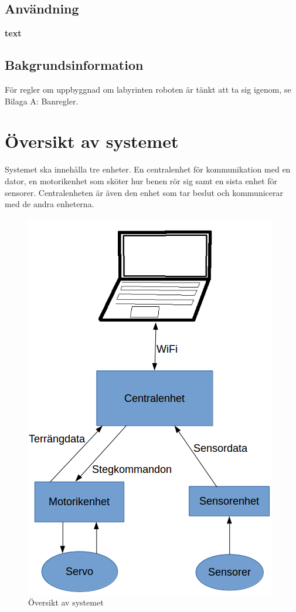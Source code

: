 \documentclass[a4paper,titlepage,12pt]{article}
\begin{document}
	\subsection{Användning}
	\textbf{text}
	\subsection{Bakgrundsinformation}
	För regler om uppbyggnad om labyrinten roboten är tänkt att ta sig igenom, se
	Bilaga A: Banregler.


	\section{Översikt av systemet}
	Systemet ska innehålla tre enheter. En centralenhet för kommunikation med en dator, en motorikenhet
	som sköter hur benen rör sig samt en sista enhet för sensorer. Centralenheten är även den enhet som
	tar beslut och kommunicerar med de andra enheterna.
	\begin{figure}[h]
		\centering
		\includegraphics[width=0.8\linewidth]{images/overview.png}
		\caption{Översikt av systemet}
		\label{fig:images/overview}
	\end{figure}
\end{document}
